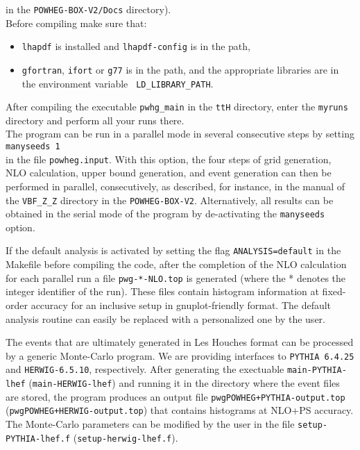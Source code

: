 \documentclass[a4paper,11pt]{article}
\newcommand\POWHEGBOXV{{\tt POWHEG-BOX-V2}}
\newcommand\PYTHIA{{\tt PYTHIA}}
\begin{document}
in the {\tt POWHEG-BOX-V2/Docs} directory).
\\[2ex]
Before compiling make sure that:
\begin{itemize}
\item 
{\tt lhapdf} is installed and {\tt lhapdf-config} is in the path,
\item
{\tt gfortran}, {\tt ifort} or {\tt g77} is in the path, and the
appropriate libraries are in the environment variable {\tt
  LD\_LIBRARY\_PATH}. 
\end{itemize}
After compiling the executable {\tt pwhg\_main} in the {\tt ttH} directory, enter the {\tt myruns} directory and perform all your runs there. 
\\[2ex]
The program can be run in a parallel mode in several consecutive steps by setting 
\\[2ex]
{\tt manyseeds   1}
\\[2ex]
in the file  {\tt powheg.input}.  With this option, the four steps of grid generation, NLO calculation, upper bound generation, and event generation can then be performed in parallel, consecutively, as described, for instance, in the manual of the {\tt VBF\_Z\_Z} directory in the \POWHEGBOXV{}. Alternatively, all results can be obtained in the serial mode of the program by de-activating the  {\tt manyseeds} option. 

If the default analysis is activated by setting the flag 
{\tt ANALYSIS=default} in the Makefile before compiling the code, after the completion of the NLO calculation for each parallel run a file {\tt  pwg-*-NLO.top} is generated (where the * denotes the integer
identifier of the run). These files contain histogram information at fixed-order accuracy for an inclusive setup in gnuplot-friendly format. The default analysis routine can easily be replaced with a personalized one by the user.  

The events that are ultimately generated in Les Houches format can be processed by a generic Monte-Carlo program. We are providing interfaces to \PYTHIA~{\tt 6.4.25}  and {\tt HERWIG-6.5.10}, respectively. After generating the exectuable {\tt main-PYTHIA-lhef} ({\tt main-HERWIG-lhef}) and running it in the directory where the event files are stored, the program produces an output file {\tt pwgPOWHEG+PYTHIA-output.top} ({\tt pwgPOWHEG+HERWIG-output.top}) that contains histograms at NLO+PS accuracy. The Monte-Carlo parameters can be modified by the user in the file {\tt setup-PYTHIA-lhef.f} ({\tt setup-herwig-lhef.f}). 
\end{document}
